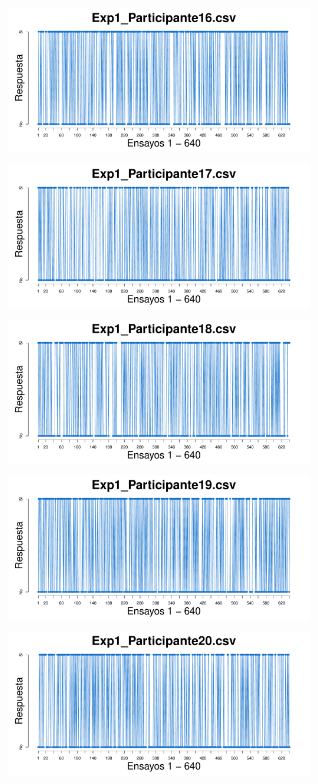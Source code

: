 \documentclass[a4paper ]{article}
\begin{document}
\begin{figure}[th]
\begin{center}
\includegraphics[width=8cm, height=4cm]{Figures/Response_Exp1_P16} \includegraphics[width=8cm, height=4cm]{Figures/Response_Exp1_P17} \includegraphics[width=8cm, height=4cm]{Figures/Response_Exp1_P18}
\includegraphics[width=8cm, height=4cm]{Figures/Response_Exp1_P19} \hspace{2cm} \includegraphics[width=8cm, height=4cm]{Figures/Response_Exp1_P20} 
\end{center}
\end{figure}
\clearpage
\end{document}
